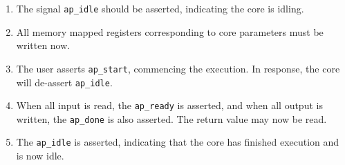 \begin{enumerate}
\item	The signal \texttt{ap\_idle} should be asserted, indicating the core is idling.
\item	All memory mapped registers corresponding to core parameters must be written now.
\item	The user asserts \texttt{ap\_start}, commencing the execution. In response,
	the core will de-assert \texttt{ap\_idle}.
\item	When all input is read, the \texttt{ap\_ready} is asserted, and when all
	output is written, the \texttt{ap\_done} is also asserted.
	The return value may now be read.
\item	The \texttt{ap\_idle} is asserted, indicating that the core has
	finished execution and is now idle.
\end{enumerate}


